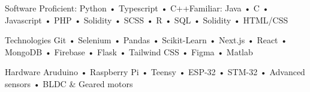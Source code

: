 

\begin{cvskills}

  \cvskill
    {Software} %
    {Proficient: Python • Typescript • C++\space\space\space Familiar: Java • C • Javascript • PHP • Solidity • SCSS • R • SQL • Solidity • HTML/CSS }%

  \cvskill
    {Technologies} %
    {Git • Selenium • Pandas • Scikit-Learn • Next.js • React • MongoDB • Firebase • Flask • Tailwind CSS • Figma • Matlab } %

  \cvskill
    {Hardware} %
    {Aruduino • Raspberry Pi • Teensy • ESP-32 • STM-32 • Advanced sensors • BLDC \& Geared motors} %

\end{cvskills}

